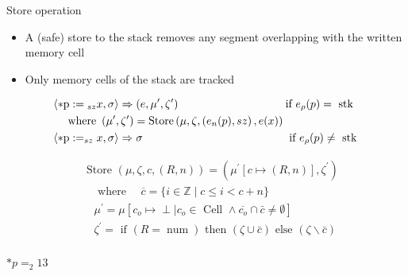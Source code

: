 \documentclass[aspectratio=169]{beamer}
\begin{document}
\begin{frame}{Store operation}
\begin{itemize}
    \item A (safe) store to the stack removes any segment overlapping with the written memory cell
    \item Only memory cells of the stack are tracked
\end{itemize}
\begin{align*}
& \left\langle * \mathrm{p}:={ }_{s z} x, \sigma\right\rangle \Rightarrow\left(e, \mu^{\prime}, \zeta^{\prime}\right) \quad \hspace{3cm} \text{if } e_\rho(p)=\text{ stk } \\
& \hspace{0.4cm} \text{ where }\left(\mu^{\prime}, \zeta^{\prime}\right)=\operatorname{Store}\left(\mu, \zeta,\left(e_n(p), s z\right), e(x)\right) \\
& \left\langle * \mathrm{p}:=_{s z} x, \sigma\right\rangle \Rightarrow \sigma \quad \hspace{4.3cm} \text{if } e_\rho(p) \neq \text{ stk } \\
\end{align*}

\begin{minipage}{0.1\textwidth}

\begin{align*}
& \text { Store }(\mu, \zeta, c,(R, n))=\left(\mu^{\prime}[c \mapsto(R, n)], \zeta^{\prime}\right) \\
& \quad \text { where } \quad \overline{c}=\{i \in \mathbb{Z} \mid c \leq i<c+n\}\\
& \quad \mu^{\prime}=\mu\left[c_o \mapsto \perp \mid c_o \in \text { Cell } \wedge \overline{c_o} \cap \bar{c} \neq \emptyset\right] \\
& \quad \zeta^{\prime}=\text { if }(R=\operatorname{num}) \text { then }(\zeta \cup \bar{c}) \text { else }(\zeta \backslash \bar{c}) \\
\end{align*}

\end{minipage}
\begin{minipage}{0.12\textwidth}$*p=_2 13$
\end{minipage}%
\hspace*{0cm}
\begin{minipage}{0.05\textwidth}
\end{minipage}


\end{frame}
\end{document}
